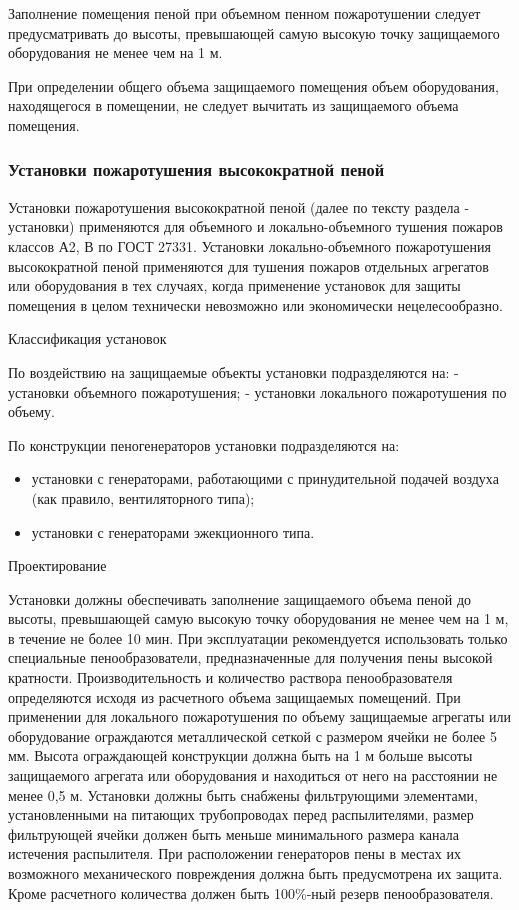 Заполнение помещения пеной при объемном пенном пожаротушении следует предусматривать до высоты, превышающей самую высокую
точку защищаемого оборудования не менее чем на 1 м.

При определении общего объема защищаемого помещения объем оборудования, находящегося в помещении, не следует вычитать
из защищаемого объема помещения.

\subsubsection{Установки пожаротушения высокократной пеной}
Установки пожаротушения высокократной пеной (далее по тексту раздела - установки) применяются для объемного и локально-объемного
тушения пожаров классов А2, В по ГОСТ 27331. Установки локально-объемного пожаротушения высокократной пеной применяются для
тушения пожаров отдельных агрегатов или оборудования в тех случаях, когда применение установок для защиты помещения в целом
технически невозможно или экономически нецелесообразно.

Классификация установок

По воздействию на защищаемые объекты установки подразделяются на:
- установки объемного пожаротушения;
- установки локального пожаротушения по объему.

По конструкции пеногенераторов установки подразделяются на:
\begin{itemize}
\item установки с генераторами, работающими с принудительной подачей воздуха (как правило, вентиляторного типа);
\item установки с генераторами эжекционного типа.
\end{itemize}

Проектирование

Установки должны обеспечивать заполнение защищаемого объема пеной до высоты, превышающей самую высокую точку оборудования не менее чем
на 1 м, в течение не более 10 мин. При эксплуатации рекомендуется использовать только специальные пенообразователи,
предназначенные для получения пены высокой кратности. Производительность и количество раствора пенообразователя определяются
исходя из расчетного объема защищаемых помещений. При применении для локального пожаротушения по объему защищаемые агрегаты
или оборудование ограждаются металлической сеткой с размером ячейки не более 5 мм. Высота ограждающей конструкции должна быть
на 1 м больше высоты защищаемого агрегата или оборудования и находиться от него на расстоянии не менее 0,5 м. Установки должны
быть снабжены фильтрующими элементами, установленными на питающих трубопроводах перед распылителями, размер фильтрующей ячейки
должен быть меньше минимального размера канала истечения распылителя. При расположении генераторов пены в местах их возможного
механического повреждения должна быть предусмотрена их защита. Кроме расчетного количества должен быть 100\%-ный резерв
пенообразователя.

